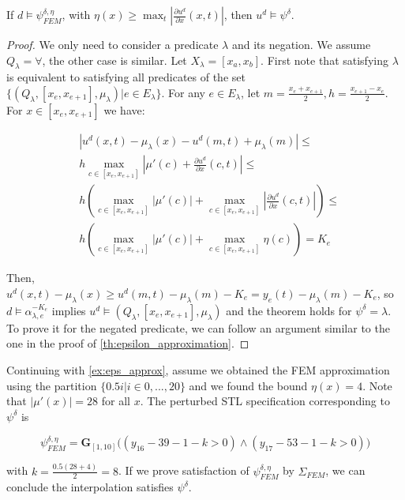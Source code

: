 \documentclass[oribibl]{llncs/llncs}
\newcommand{\Always}{\mathbf{G}}
\begin{document}
\begin{theorem}
\label{th:eta_approximation}
    If $d \models \psi^{\delta, \eta}_{FEM}$, with $\eta(x) \geq \max_t |\frac{\partial
    u^d}{\partial x}(x, t)|$, then $u^d \models \psi^\delta$.
\end{theorem}
\begin{proof}
    We only need to consider a predicate $\lambda$ and its negation. We assume
    $Q_\lambda = \forall$, the other case is similar. Let $X_\lambda = [x_a,
    x_b]$. First note that satisfying $\lambda$ is equivalent to satisfying all
    predicates of the set $\{(Q_\lambda, [x_e, x_{e+1}], \mu_\lambda) | e \in
    E_\lambda\}$. For any $e \in E_\lambda$, let $m = \frac{x_e + x_{e+1}}{2}, 
    h = \frac{x_{e+1} - x_{e}}{2}$. 
    For $x \in [x_e, x_{e+1}]$ we have:

    \begin{equation}
    \begin{aligned}
        &|u^d(x, t) - \mu_\lambda(x) - u^d(m, t) + \mu_\lambda(m)| \leq \\
        &h \max_{c \in [x_e, x_{e+1}]} 
        |\mu'(c) + \frac{\partial u^d}{\partial x}(c, t)|
        \leq \\
        &h \left (  
        \max_{c \in [x_e, x_{e+1}]} |\mu'(c)| +
        \max_{c \in [x_e, x_{e+1}]} |\frac{\partial u^d}{\partial x}(c, t)|
        \right ) \leq \\
        &h \left (  
        \max_{c \in [x_e, x_{e+1}]} |\mu'(c)| +
        \max_{c \in [x_e, x_{e+1}]} \eta(c)
        \right )  = K_e
    \end{aligned}
    \end{equation}

    Then, $u^d(x, t) - \mu_\lambda(x) \geq u^d(m, t) - \mu_\lambda(m) - K_e =
    y_e(t) - \mu_\lambda(m) - K_e$, so $d \models \alpha^{-K_e}_{\lambda, e}$
    implies $u^d \models (Q_\lambda, [x_e, x_{e+1}], \mu_\lambda)$ and the
    theorem holds for $\psi^\delta = \lambda$. To prove it for the negated
    predicate, we can follow an argument similar to the one in the proof of
    \cref{th:epsilon_approximation}.
\end{proof}

\begin{example}
    \label{ex:eta_approx}

    Continuing with \cref{ex:eps_approx}, assume we obtained the FEM
    approximation using the partition $\{0.5 i | i \in 0,...,20\}$ and we found the
    bound $\eta(x) = 4$. Note that $|\mu'(x)| = 28$ for all $x$. The perturbed STL
    specification corresponding to $\psi^\delta$ is

    \begin{equation}
        \psi^{\delta, \eta}_{FEM} = \Always_{[1,10]} \bigl(
            (y_{16} - 39 - 1 - k > 0) \land (y_{17} - 53 - 1 - k > 0)
        \bigr)
    \end{equation}

    with $k = \frac{0.5 (28 + 4)}{2} = 8$. If we prove satisfaction of $\psi^{\delta,
    \eta}_{FEM}$ by $\Sigma_{FEM}$, we can conclude the interpolation satisfies
    $\psi^\delta$.
    
\end{example}
\end{document}
